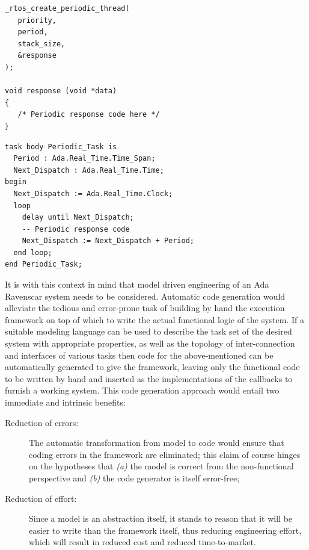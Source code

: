 \begin{minipage}{0.40\linewidth}
\lstset{language=c}
\begin{lstlisting}[label=lst:api_thread, caption = RTOS API for thread
  creation]
_rtos_create_periodic_thread(
   priority, 
   period,
   stack_size, 
   &response
);

void response (void *data)
{
   /* Periodic response code here */
}
\end{lstlisting}
\end{minipage}
\hspace{8mm}
\begin{minipage}{0.50\linewidth}
\lstset{language=ada}
\begin{lstlisting}[label=lst:ada_task, caption=An Ada Ravenscar
    periodic task]
task body Periodic_Task is
  Period : Ada.Real_Time.Time_Span;
  Next_Dispatch : Ada.Real_Time.Time;
begin
  Next_Dispatch := Ada.Real_Time.Clock;
  loop
    delay until Next_Dispatch;
    -- Periodic response code
    Next_Dispatch := Next_Dispatch + Period;
  end loop;
end Periodic_Task;
\end{lstlisting}
\end{minipage}

It is with this context in mind that model driven engineering of an
Ada Ravenscar system needs to be considered. Automatic code generation
would alleviate the tedious and error-prone task of building by hand
the execution framework on top of which to write the actual functional
logic of the system. If a suitable modeling language can be used to
describe the task set of the desired system with appropriate
properties, as well as the topology of inter-connection and interfaces
of various tasks then code for the above-mentioned can be
automatically generated to give the framework, leaving only the
functional code to be written by hand and inserted as the
implementations of the callbacks to furnish a working system. This
code generation approach would entail two immediate and intrinsic
benefits:

\begin{description}
\item[Reduction of errors:]{The automatic transformation from model to
  code would ensure that coding errors in the framework are
  eliminated; this claim of course hinges on the hypotheses that
  \emph{(a)} the model is correct from the non-functional perspective
  and \emph{(b)} the code generator is itself error-free;}
\item[Reduction of effort:]{Since a model is an abstraction itself, it
  stands to reason that it will be easier to write than the framework
  itself, thus reducing engineering effort, which will result in
  reduced cost and reduced time-to-market.}
\end{description}

